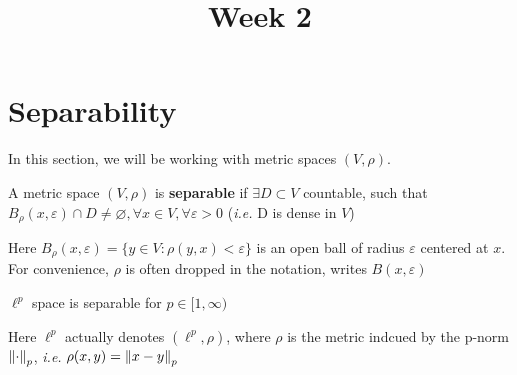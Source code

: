 \documentclass{article}
\title{Week 2}
\begin{document}
\maketitle


\section{Separability}  

In this section, we will be working with metric spaces \((V, \rho)\).

\begin{definition}[Separable]
	A metric space $(V,\rho)$ is \textbf{separable} if \(\exists D \subset V\) countable, 
	such that \(B_{\rho}(x, \varepsilon) \cap D \neq \varnothing, \forall x \in V, \forall \varepsilon >0\) 
	(\textit{i.e.} D is dense in \(V\))
\end{definition}

Here \(B_{\rho}(x, \varepsilon)=\{y \in V: \rho (y,x) < \varepsilon\}\) is an open ball of radius \(\varepsilon\) 
centered at \(x\). For convenience, $\rho$ is often dropped in the notation, writes $B(x, \varepsilon)$

\begin{proposition}
	\(\ell^p\) space is separable for \(p \in [1, \infty)\)
\end{proposition}  
Here $\ell^p$ actually denotes  \((\ell^p, \rho)\), where \(\rho\) is the metric indcued by the p-norm \(\left\|{\cdot}\right\|_p\), 
\textit{i.e.} \(\rho(x,y)=\left\|{x-y}\right\|_p\)
\end{document}
